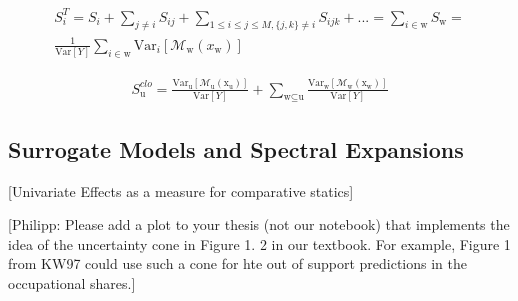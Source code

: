 \begin{equation}
\begin{aligned}
S_i^T = S_i + \sum_{j \ne i} S_{ij} + \sum_{1 \leq i \leq j \leq M,\{j,k\} \ne i} S_{ijk} + ... = \sum_{i \in \text{w}} S_\text{w} = \\
\frac{1}{\text{Var}[Y]}\sum_{i \in \text{w}} \text{Var}_i[\mathcal{M}_\text{w}(x_\text{w})]
\end{aligned}
\end{equation}

\begin{align}
S_\text{u}^{clo} = \frac{\text{Var}_\text{u}[\mathcal{M}_\text{u}(\text{x}_\text{u})]}{\text{Var}[Y]} +  \sum_{\text{w} \subseteq \text{u}} \frac{\text{Var}_\text{w}[\mathcal{M}_\text{w}(\text{x}_\text{w})]}{\text{Var}[Y]}
\end{align}


\subsection{Surrogate Models and Spectral Expansions}


[Univariate Effects as a measure for comparative statics]

[Philipp: Please add a plot to your thesis (not our notebook) that implements the idea of the uncertainty cone in Figure 1. 2 in our textbook. For example, Figure 1 from KW97 could use such a cone for hte out of support predictions in the occupational shares.]

\newpage
